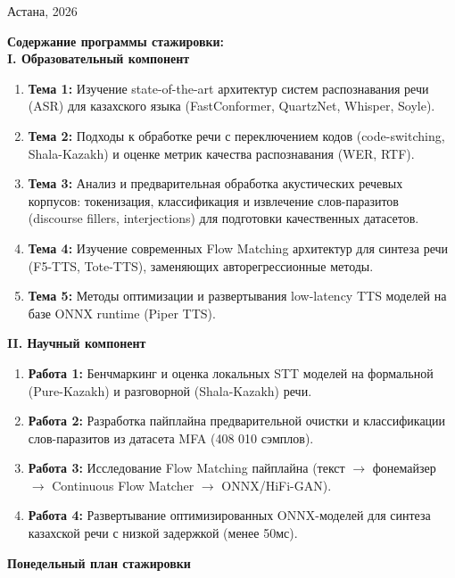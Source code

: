 \documentclass[12pt,a4paper]{article}
\begin{document}
\vfill
\begin{center}
Астана, 2026
\end{center}

\newpage

\noindent\textbf{Содержание программы стажировки:}\\[2mm]
\textbf{I. Образовательный компонент}
\begin{enumerate}
    \item \textbf{Тема 1:} Изучение state-of-the-art архитектур систем распознавания речи (ASR) для казахского языка (FastConformer, QuartzNet, Whisper, Soyle).
    \item \textbf{Тема 2:} Подходы к обработке речи с переключением кодов (code-switching, Shala-Kazakh) и оценке метрик качества распознавания (WER, RTF).
    \item \textbf{Тема 3:} Анализ и предварительная обработка акустических речевых корпусов: токенизация, классификация и извлечение слов-паразитов (discourse fillers, interjections) для подготовки качественных датасетов.
    \item \textbf{Тема 4:} Изучение современных Flow Matching архитектур для синтеза речи (F5-TTS, Tote-TTS), заменяющих авторегрессионные методы.
    \item \textbf{Тема 5:} Методы оптимизации и развертывания low-latency TTS моделей на базе ONNX runtime (Piper TTS).
\end{enumerate}

\vspace{3mm}
\noindent\textbf{II. Научный компонент}
\begin{enumerate}
    \item \textbf{Работа 1:} Бенчмаркинг и оценка локальных STT моделей на формальной (Pure-Kazakh) и разговорной (Shala-Kazakh) речи.
    \item \textbf{Работа 2:} Разработка пайплайна предварительной очистки и классификации слов-паразитов из датасета MFA (408 010 сэмплов).
    \item \textbf{Работа 3:} Исследование Flow Matching пайплайна (текст $\rightarrow$ фонемайзер $\rightarrow$ Continuous Flow Matcher $\rightarrow$ ONNX/HiFi-GAN).
    \item \textbf{Работа 4:} Развертывание оптимизированных ONNX-моделей для синтеза казахской речи с низкой задержкой (менее 50мс).
\end{enumerate}

\vspace{5mm}
\noindent\textbf{Понедельный план стажировки}
\end{document}
